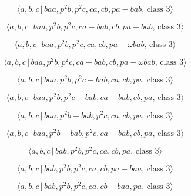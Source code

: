 \documentclass[10pt]{article}
\begin{document}
\begin{equation}
\langle a,b,c\,|\,baa,p^2b,p^2c,ca,cb,pa-bab,\,\text{class }3\rangle 
\tag{7.2643}
\end{equation}

\begin{equation}
\langle a,b,c\,|\,baa,p^2b,p^2c,ca-bab,cb,pa-bab,\,\text{class }3\rangle 
\tag{7.2644}
\end{equation}

\begin{equation}
\langle a,b,c\,|\,baa,p^{2}b,p^{2}c,ca,cb,pa-\omega bab,\,\text{class }%
3\rangle  \tag{7.2645}
\end{equation}

\begin{equation}
\langle a,b,c\,|\,baa,p^{2}b,p^{2}c,ca-bab,cb,pa-\omega bab,\,\text{class }%
3\rangle  \tag{7.2646}
\end{equation}

\begin{equation}
\langle a,b,c\,|\,baa,p^2b,p^2c-bab,ca,cb,pa,\,\text{class }3\rangle 
\tag{7.2647}
\end{equation}

\begin{equation}
\langle a,b,c\,|\,baa,p^2b,p^2c-bab,ca-bab,cb,pa,\,\text{class }3\rangle 
\tag{7.2648}
\end{equation}

\begin{equation}
\langle a,b,c\,|\,baa,p^2b-bab,p^2c,ca,cb,pa,\,\text{class }3\rangle 
\tag{7.2649}
\end{equation}

\begin{equation}
\langle a,b,c\,|\,baa,p^2b-bab,p^2c,ca-bab,cb,pa,\,\text{class }3\rangle 
\tag{7.2650}
\end{equation}

\begin{equation}
\langle a,b,c\,|\,bab,p^2b,p^2c,ca,cb,pa,\,\text{class }3\rangle 
\tag{7.2651}
\end{equation}

\begin{equation}
\langle a,b,c\,|\,bab,p^2b,p^2c,ca,cb,pa-baa,\,\text{class }3\rangle 
\tag{7.2652}
\end{equation}

\begin{equation}
\langle a,b,c\,|\,bab,p^2b,p^2c,ca,cb-baa,pa,\,\text{class }3\rangle 
\tag{7.2653}
\end{equation}
\end{document}
